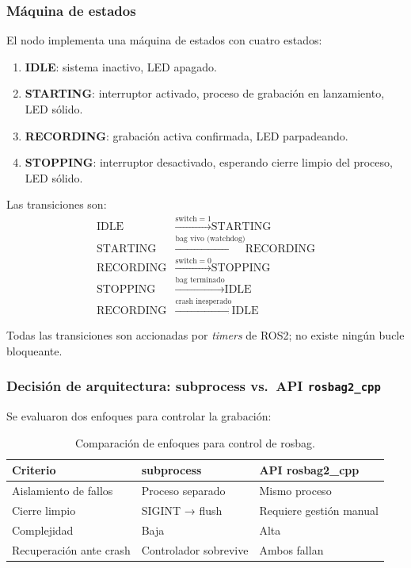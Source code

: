 \subsubsection{Máquina de estados}

El nodo implementa una máquina de estados con cuatro estados:

\begin{enumerate}
  \item \textbf{IDLE}: sistema inactivo, LED apagado.
  \item \textbf{STARTING}: interruptor activado, proceso de grabación en
        lanzamiento, LED sólido.
  \item \textbf{RECORDING}: grabación activa confirmada, LED parpadeando.
  \item \textbf{STOPPING}: interruptor desactivado, esperando cierre limpio
        del proceso, LED sólido.
\end{enumerate}

Las transiciones son:
\begin{align*}
  \text{IDLE}      &\xrightarrow{\text{switch}=1} \text{STARTING} \\
  \text{STARTING}  &\xrightarrow{\text{bag vivo (watchdog)}} \text{RECORDING} \\
  \text{RECORDING} &\xrightarrow{\text{switch}=0} \text{STOPPING} \\
  \text{STOPPING}  &\xrightarrow{\text{bag terminado}} \text{IDLE} \\
  \text{RECORDING} &\xrightarrow{\text{crash inesperado}} \text{IDLE}
\end{align*}

Todas las transiciones son accionadas por \emph{timers} de ROS2; no existe
ningún bucle bloqueante.

\subsubsection{Decisión de arquitectura: subprocess vs.\ API \texttt{rosbag2\_cpp}}

Se evaluaron dos enfoques para controlar la grabación:

\begin{table}[H]
\centering
\begin{tabular}{lll}
\toprule
\textbf{Criterio} & \textbf{subprocess} & \textbf{API rosbag2\_cpp} \\
\midrule
Aislamiento de fallos & Proceso separado & Mismo proceso \\
Cierre limpio          & SIGINT → flush    & Requiere gestión manual \\
Complejidad            & Baja              & Alta \\
Recuperación ante crash & Controlador sobrevive & Ambos fallan \\
\bottomrule
\end{tabular}
\caption{Comparación de enfoques para control de rosbag.}
\label{tab:rosbag-approaches}
\end{table}

